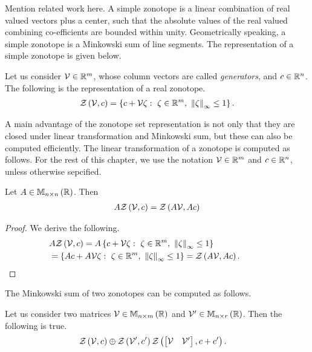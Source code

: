 
{\color{red}Mention related work here.}
A simple zonotope is a linear combination of real valued vectors plus a
center, such that the absolute values of the real valued combining
co-efficients are bounded within unity.  Geometrically speaking, a
simple zonotope is a Minkowski sum of line segments.  The
representation of a simple zonotope is given below.
%
\begin{definition}
Let us consider $\mathcal{V}\in\mathbb{R}^m$, whose column vectors are called
{\it generators}, and $c\in\mathbb{R}^n$.  The following is the
representation of a real zonotope.
%
\begin{align*}
\mathit{\mathcal{Z}}\left(\mathcal{V},c\right)=\left\{c+\mathcal{V}\zeta:~\zeta\in\mathbb{R}^m,~\left\|\zeta\right\|_{\infty}\leq 1\right\}.
\end{align*}
%
\end{definition}
%
A main advantage of the zonotope set representation is not only that
they are closed under linear transformation and Minkowski sum, but
these can also be computed efficiently.  The linear transformation of
a zonotope is computed as follows.  For the rest of this chapter, we
use the notation $\mathcal{V}\in\mathbb{R}^m$ and $c\in\mathbb{R}^n$, unless
otherwise sepcified.
%
\begin{lemma}
Let $A\in\mathbb{M}_{n\times n}\left(\mathbb{R}\right)$.  Then
%
\begin{align*}
A\mathit{\mathcal{Z}}\left(\mathcal{V},c\right)=\mathit{\mathcal{Z}}\left(A\mathcal{V},Ac\right)
\end{align*}
%
\end{lemma} 
%
\begin{proof}
We derive the following.
%
\begin{align*}
&
  A\mathit{\mathcal{Z}}\left(\mathcal{V},c\right)=A\left\{c+\mathcal{V}\zeta:~\zeta\in\mathbb{R}^m,~\left\|\zeta\right\|_{\infty}\leq
    1\right\}\\
& = \left\{Ac+A\mathcal{V}\zeta:~\zeta\in\mathbb{R}^m,~\left\|\zeta\right\|_{\infty}\leq 1\right\}=\mathit{\mathcal{Z}}\left(A\mathcal{V},Ac\right).\hspace{3em}\qedhere
\end{align*}
%
\end{proof}
%
The Minkowski sum of two zonotopes can be computed as follows.
%
\begin{lemma}
Let us consider two matrices $\mathcal{V}\in\mathbb{M}_{n\times m}\left(\mathbb{R}\right)$ and
$\mathcal{V}^\prime\in\mathbb{M}_{n\times r}\left(\mathbb{R}\right)$.  Then the following is true.
%
\begin{align*}
& \mathit{\mathcal{Z}}\left(\mathcal{V},c\right)\oplus\mathit{\mathcal{Z}}\left(\mathcal{V}^\prime,c^\prime\right)
 \mathit{\mathcal{Z}}\left(\left[\begin{matrix}\mathcal{V} & \mathcal{V}^\prime\end{matrix}\right],c+c^\prime\right).  
\end{align*}
%
\end{lemma}
